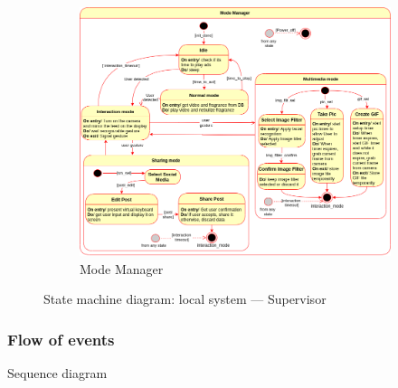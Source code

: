 \begin{figure}[htb!]
%
%
  \begin{subfigure}{.9\textwidth}
  \includegraphics[width=\textwidth]{img/state-mach-local-superv-mode.png}%
  \caption{Mode Manager}%
  \label{fig:state-mach-local-superv-mode}
\end{subfigure}
  \caption{State machine diagram: local system --- Supervisor}%
  \label{fig:state-mach-local-superv}
\end{figure}
%
%
\subsubsection{Flow of events}%
\label{sec:flow-events}
Sequence diagram


